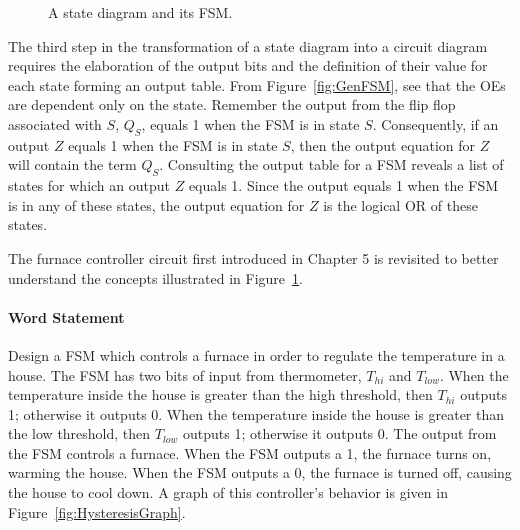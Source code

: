 \begin{figure}[ht]
\caption{A state diagram and its FSM.}
\label{fig:ones}
\end{figure}

The third step in the transformation of a state diagram into a circuit
diagram requires the elaboration of the output bits and the definition of their
value for each state forming an output table.  From Figure~\ref{fig:GenFSM}, 
see that the OEs are dependent only on the state.  Remember the
output from the flip flop associated with $S$, $Q_S$, equals 1 when the 
FSM is in state $S$.  Consequently, if an output $Z$ equals 1 when the 
FSM is in state $S$, then the output equation for $Z$ will contain the
term $Q_S$.  Consulting the output table for a FSM reveals a list
of states for which an output $Z$ equals 1.  Since the output equals
1 when the FSM is in any of these states, the output equation for $Z$
is the logical OR of these states.

The furnace controller circuit first introduced in Chapter 5 is 
revisited to better understand the concepts illustrated in 
Figure~\ref{fig:ones}.



\paragraph{Word Statement} 
Design a FSM which controls a furnace in order to regulate the 
temperature in a house.  The FSM has two bits of input from thermometer,
$T_{hi}$ and $T_{low}$.  When the temperature inside the house 
is greater than the high threshold, then $T_{hi}$ outputs 1; otherwise 
it outputs 0.  When the temperature inside the house is greater than 
the low threshold, then $T_{low}$ outputs 1; otherwise it outputs 0.  
The output from the FSM controls a furnace.  When the FSM outputs a 
1, the furnace turns on, warming the house.  When the FSM outputs a 0, 
the furnace is turned off, causing the house to cool down.  A graph
of this controller's behavior is given in Figure~\ref{fig:HysteresisGraph}.

